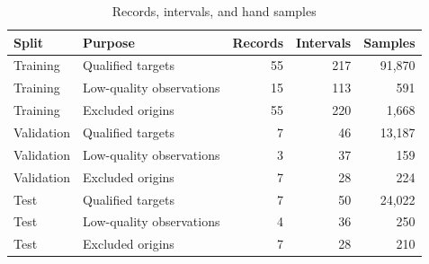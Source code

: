 \begin{table}[htbp]
\centering
\small
\caption{Records, intervals, and hand samples}
\label{tab:retention_counts}
\setlength{\tabcolsep}{4pt}
\begin{tabular}{llrrr}
\toprule
Split & Purpose & Records & Intervals & Samples\\
\midrule
Training & Qualified targets & 55 & 217 & 91,870\\
Training & Low-quality observations & 15 & 113 & 591\\
Training & Excluded origins & 55 & 220 & 1,668\\
Validation & Qualified targets & 7 & 46 & 13,187\\
Validation & Low-quality observations & 3 & 37 & 159\\
Validation & Excluded origins & 7 & 28 & 224\\
Test & Qualified targets & 7 & 50 & 24,022\\
Test & Low-quality observations & 4 & 36 & 250\\
Test & Excluded origins & 7 & 28 & 210\\
\bottomrule
\end{tabular}
\end{table}
